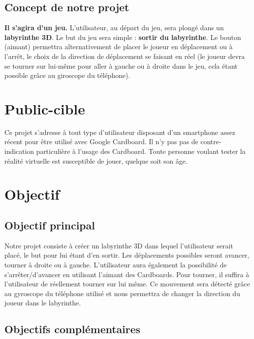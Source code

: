 \subsection{Concept de notre projet}

\textbf{Il s'agira d'un jeu.} L'utilisateur, au départ du jeu, sera plongé dans un \textbf{labyrinthe 3D}. Le but du jeu sera simple : \textbf{sortir du labyrinthe}. Le bouton (aimant) permettra alternativement de placer le joueur en déplacement ou à l'arrêt, le choix de la direction de déplacement se faisant \og{}en réel\fg{} (le joueur devra se tourner sur lui-même pour aller à gauche ou à droite dans le jeu, cela étant possible grâce au giroscope du téléphone).

\section{Public-cible}

Ce projet s'adresse à tout type d'utilisateur disposant d'un smartphone assez récent pour être utilisé avec Google Cardboard. Il n'y pas pas de contre-indication particulière à l'usage des Cardboard. Toute personne
voulant tester la réalité virtuelle est susceptible de jouer, quelque soit son âge.

\section{Objectif}

\subsection{Objectif principal}

Notre projet consiste à créer un labyrinthe 3D dans lequel l'utilisateur serait placé, le but pour lui étant d'en sortir. Les déplacements possibles seront \og{}avancer\fg{}, \og{}tourner à droite\fg{} ou \og{}à gauche\fg{}. L'utilisateur aura également la possibilité de s'arrêter/d'avancer en utilisant l'aimant des Cardboards. Pour tourner, il suffira à l'utilisateur de réellement tourner sur lui même. Ce mouvement sera détecté grâce au gyroscope du téléphone utilisé et nous permettra de changer la direction du joueur dans le labyrinthe.

\subsection{Objectifs complémentaires}\label{sub:objectifs_complementaires}

